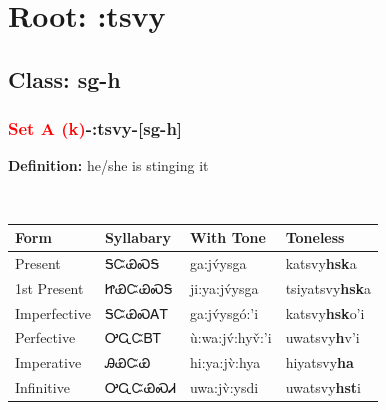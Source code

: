 \needspace{4in}
\section*{Root: :tsvy}
\nopagebreak
{}
\needspace{3in}
\subsection*{Class: sg-h}
\nopagebreak
\needspace{2in}
\subsubsection*{\textcolor{Red}{Set A (k)}{-}\textbf{:tsvy}{-}[sg-h]}
\nopagebreak
\textbf{Definition: } he/she is stinging it
\\[0.5em]
\begin{tabularx}{\textwidth}{l X X X}%
\toprule%
\textbf{Form}&\textbf{Syllabary}&\textbf{With Tone}&\textbf{Toneless}\\%
\midrule%
Present&ᎦᏨᏯᏍᎦ&ga:jv́ysga&katsvy\textbf{hsk}a\\%
1st Present&ᏥᏯᏨᏯᏍᎦ&ji:ya:jv́ysga&tsiyatsvy\textbf{hsk}a\\%
Imperfective&ᎦᏨᏯᏍᎪᎢ&ga:jv́ysgó:’i&katsvy\textbf{hsk}o'i\\%
Perfective&ᎤᏩᏨᏴᎢ&ù:wa:jv́:hyv̌:’i&uwatsvy\textbf{h}v'i\\%
Imperative&ᎯᏯᏨᏯ&hi:ya:jv̀:hya&hiyatsvy\textbf{ha}\\%
Infinitive&ᎤᏩᏨᏯᏍᏗ&uwa:jv̀:ysdi&uwatsvy\textbf{hst}i\\%
\bottomrule%
\end{tabularx}
\\[1em]